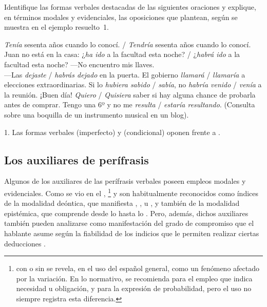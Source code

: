 \begin{ejercicio}\label{ej:14-formas}
Identifique las formas verbales destacadas de las siguientes oraciones y
explique, en términos modales y evidenciales, las oposiciones que plantean,
según se muestra en el ejemplo resuelto~1.

\begin{exe}
  \ex \textit{Tenía} sesenta años cuando lo conocí. / \textit{Tendría} sesenta
      años cuando lo conocí.
  \ex Juan no está en la casa: ¿\textit{ha ido} a la facultad esta noche? /
      ¿\textit{habrá ido} a la facultad esta noche?
  \ex ---No encuentro mis llaves.\\
      ---Las \textit{dejaste} / \textit{habrás dejado} en la puerta.
  \ex El gobierno \textit{llamará} / \textit{llamaría} a elecciones
      extraordinarias.
  \ex Si lo \textit{hubiera sabido} / \textit{sabía}, no \textit{habría venido} /
      \textit{venía} a la reunión.
  \ex ¡Buen día! \textit{Quiero} / \textit{Quisiera} saber si hay alguna chance de
      probarla antes de comprar. Tengo una 6º y no me \textit{resulta} /
      \textit{estaría resultando}. (Consulta sobre una boquilla de un
      instrumento musical en un blog).
\end{exe}

\begin{resuelto}
1. Las formas verbales  (imperfecto) y 
(condicional) oponen  frente a .
\end{resuelto}
\end{ejercicio}

\subsection{Los auxiliares de perífrasis}\label{sec:14-auxiliares}

Algunos de los auxiliares de las perífrasis verbales poseen empleos modales y
evidenciales. Como se vio en el , \footnote{ con  o sin  se revela, en el
uso del español general, como un fenómeno afectado por la variación. En lo
normativo, se recomienda  para el empleo que indica necesidad u
obligación, y  para la expresión de probabilidad, pero el uso no
siempre registra esta diferencia.} y  son habitualmente
reconocidos como índices de la modalidad deóntica, que manifiesta
, ,  u , y también de
la modalidad epistémica, que comprende desde lo  hasta lo
. Pero, además, dichos auxiliares también pueden analizarse como
manifestación del grado de compromiso que el hablante asume según la fiabilidad
de los indicios que le permiten realizar ciertas deducciones
\parencite{cornillie2007}.

